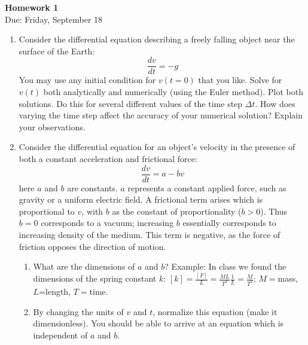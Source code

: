 \documentclass{article}
\begin{document}
\fancyfoot[C]{\thepage}
\vspace*{0cm}
\begin{center}
	{\LARGE \textbf{Homework 1}}\\
	\vspace{0.25cm}
	{\Large Due: Friday, September 18}
\end{center}

\newcommand{\textbook}{\textit{Giordano}}
\begin{enumerate}
\item Consider the differential equation describing a freely falling object near the surface of the Earth:
\begin{equation*}
	\frac{dv}{dt}=-g
\end{equation*}
You may use any initial condition for $v(t=0)$ that you like. Solve for $v(t)$ both analytically and numerically (using the Euler method). Plot both solutions. Do this for several different values of the time step $\Delta t$. How does varying the time step affect the accuracy of your numerical solution? Explain your observations.
\item Consider the differential equation for an object's velocity in the presence of both a constant acceleration and frictional force:
\begin{equation*}
\frac{dv}{dt}=a-bv
\end{equation*} 
here $a$ and $b$ are constants. $a$ represents a constant applied force, such as gravity or a uniform electric field. A frictional term arises which is proportional to $v$, with $b$ as the constant of proportionality ($b>0$). Thus $b=0$ corresponds to a vacuum; increasing $b$ essentially corresponds to increasing density of the medium. This term is negative, as the force of friction opposes the direction of motion.
	\begin{enumerate}
		\item What are the dimensions of $a$ and $b$?
		Example: In class we found the dimensions of the spring constant $k$: 
		$[k]=\frac{[F]}{L}=\frac{ML}{T^2}\frac{1}{L}=\frac{M}{T^2}$; $M=$mass, $L$=length, $T=$time.
		\item By changing the units of $v$ and $t$, normalize this equation (make it dimensionless). You should be able to arrive at an equation which is independent of $a$ and $b$.

\end{enumerate}
\end{enumerate}
\end{document}
